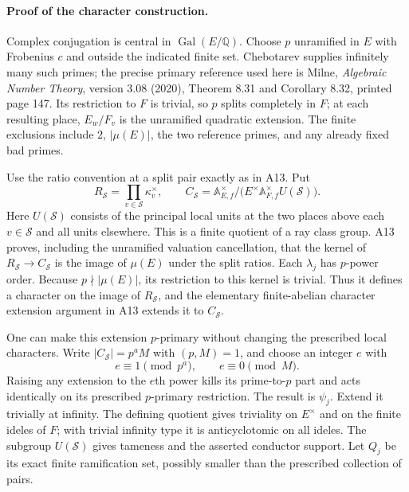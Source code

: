 \documentclass[11pt]{article}
\newcommand{\Q}{\mathbb Q}\newcommand{\C}{\mathbb C}\newcommand{\Z}{\mathbb Z}\newcommand{\R}{\mathbb R}\newcommand{\A}{\mathbb A}\newcommand{\OO}{\mathcal O}
\theoremstyle{definition}\newtheorem{definition}[theorem]{Definition}\newtheorem{remark}[theorem]{Remark}
\begin{document}
\paragraph{Proof of the character construction.}
Complex conjugation is central in $\operatorname{Gal}(E/\Q)$.
Choose $p$ unramified in $E$ with Frobenius $c$ and outside the indicated
finite set.  Chebotarev supplies infinitely many such primes; the precise
primary reference used here is Milne, \emph{Algebraic Number Theory},
version 3.08 (2020), Theorem 8.31 and Corollary 8.32, printed page 147.
Its restriction to $F$ is trivial, so $p$ splits completely in $F$;
at each resulting place, $E_w/F_v$ is the unramified quadratic
extension.  The finite exclusions include $2$, $|\mu(E)|$, the two
reference primes, and any already fixed bad primes.

Use the ratio convention at a split pair exactly as in A13.  Put
\[
 R_{\mathcal S}=\prod_{v\in\mathcal S}\kappa_v^\times,
 \qquad
 C_{\mathcal S}=
 \A_{E,f}^\times/
       \bigl(E^\times\A_{F,f}^\times U(\mathcal S)\bigr).
\]
Here $U(\mathcal S)$ consists of the principal local units at the two
places above each $v\in\mathcal S$ and all units elsewhere.  This is a
finite quotient of a ray class group.  A13 proves, including the
unramified valuation cancellation, that the kernel of
$R_{\mathcal S}\longrightarrow C_{\mathcal S}$ is the image of
$\mu(E)$ under the split ratios.  Each $\lambda_j$ has $p$-power
order.  Because $p\nmid |\mu(E)|$, its restriction to this kernel is
trivial.  Thus it defines a character on the image of
$R_{\mathcal S}$, and the elementary finite-abelian character extension
argument in A13 extends it to $C_{\mathcal S}$.

One can make this extension $p$-primary without changing the prescribed
local characters.  Write
$|C_{\mathcal S}|=p^a M$ with $(p,M)=1$, and choose an integer $e$ with
\[
 e\equiv1\pmod{p^a},\qquad e\equiv0\pmod M.
\]
Raising any extension to the $e$th power kills its prime-to-$p$ part
and acts identically on its prescribed $p$-primary restriction.  The
result is $\psi_j$.  Extend it trivially at infinity.  The defining
quotient gives triviality on $E^\times$ and on the finite ideles of
$F$; with trivial infinity type it is anticyclotomic on all ideles.
The subgroup $U(\mathcal S)$ gives tameness and the asserted conductor
support.  Let $Q_j$ be its exact finite ramification set, possibly
smaller than the prescribed collection of pairs.
\end{document}
